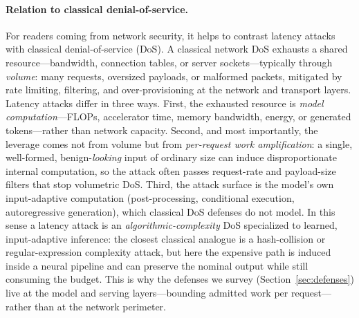 \documentclass[acmsmall,screen,review,nonacm]{acmart}
\begin{document}
\paragraph{Relation to classical denial-of-service.} For readers coming from network security, it helps to contrast latency attacks with classical denial-of-service (DoS). A classical network DoS exhausts a shared resource---bandwidth, connection tables, or server sockets---typically through \emph{volume}: many requests, oversized payloads, or malformed packets, mitigated by rate limiting, filtering, and over-provisioning at the network and transport layers. Latency attacks differ in three ways. First, the exhausted resource is \emph{model computation}---FLOPs, accelerator time, memory bandwidth, energy, or generated tokens---rather than network capacity. Second, and most importantly, the leverage comes not from volume but from \emph{per-request work amplification}: a single, well-formed, benign-\emph{looking} input of ordinary size can induce disproportionate internal computation, so the attack often passes request-rate and payload-size filters that stop volumetric DoS. Third, the attack surface is the model's own input-adaptive computation (post-processing, conditional execution, autoregressive generation), which classical DoS defenses do not model. In this sense a latency attack is an \emph{algorithmic-complexity} DoS specialized to learned, input-adaptive inference: the closest classical analogue is a hash-collision or regular-expression complexity attack, but here the expensive path is induced inside a neural pipeline and can preserve the nominal output while still consuming the budget. This is why the defenses we survey (Section~\ref{sec:defenses}) live at the model and serving layers---bounding admitted work per request---rather than at the network perimeter.

\end{document}
